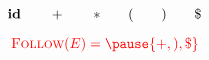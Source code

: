 






\begin{frame}
  \begin{columns}
      
  \end{columns}
\end{frame}

\begin{frame}
  \[
    \id \qquad + \qquad \ast \qquad ( \qquad ) \qquad \$
  \]

  

  \pause
  \[
    \red{\follow(E) = \pause \set{+, ), \$}}
  \]
\end{frame}
